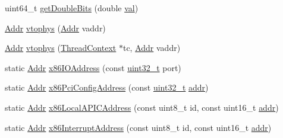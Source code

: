 \begin{DoxyCompactItemize}
\item 
uint64\_\-t \hyperlink{namespaceX86ISA_adaa2c2b77aafbc287d8624f8775f9fee}{getDoubleBits} (double \hyperlink{namespaceX86ISA_ae13bf1250853ff6b72aabe3c79b587cc}{val})
\item 
\hyperlink{base_2types_8hh_af1bb03d6a4ee096394a6749f0a169232}{Addr} \hyperlink{namespaceX86ISA_a3828815371ad2b0a1be60abdcb405cf9}{vtophys} (\hyperlink{base_2types_8hh_af1bb03d6a4ee096394a6749f0a169232}{Addr} vaddr)
\item 
\hyperlink{base_2types_8hh_af1bb03d6a4ee096394a6749f0a169232}{Addr} \hyperlink{namespaceX86ISA_ad4bbbca3210dee66152520984c3aac6a}{vtophys} (\hyperlink{classThreadContext}{ThreadContext} $\ast$tc, \hyperlink{base_2types_8hh_af1bb03d6a4ee096394a6749f0a169232}{Addr} vaddr)
\item 
static \hyperlink{base_2types_8hh_af1bb03d6a4ee096394a6749f0a169232}{Addr} \hyperlink{namespaceX86ISA_afaa9240a3523dc80cfb1ecfba872f27e}{x86IOAddress} (const \hyperlink{Type_8hh_a435d1572bf3f880d55459d9805097f62}{uint32\_\-t} port)
\item 
static \hyperlink{base_2types_8hh_af1bb03d6a4ee096394a6749f0a169232}{Addr} \hyperlink{namespaceX86ISA_a5b68d0901ef27939565621f528be9b94}{x86PciConfigAddress} (const \hyperlink{Type_8hh_a435d1572bf3f880d55459d9805097f62}{uint32\_\-t} \hyperlink{namespaceX86ISA_ab705917f60c5566f9ce56a93f798b2e2}{addr})
\item 
static \hyperlink{base_2types_8hh_af1bb03d6a4ee096394a6749f0a169232}{Addr} \hyperlink{namespaceX86ISA_afe1cfa1e015d1bc9a1aaa13453e9af92}{x86LocalAPICAddress} (const uint8\_\-t id, const uint16\_\-t \hyperlink{namespaceX86ISA_ab705917f60c5566f9ce56a93f798b2e2}{addr})
\item 
static \hyperlink{base_2types_8hh_af1bb03d6a4ee096394a6749f0a169232}{Addr} \hyperlink{namespaceX86ISA_a2f44ed2c4b9c14c0eab6bdc3b8b95c03}{x86InterruptAddress} (const uint8\_\-t id, const uint16\_\-t \hyperlink{namespaceX86ISA_ab705917f60c5566f9ce56a93f798b2e2}{addr})
\end{DoxyCompactItemize}
